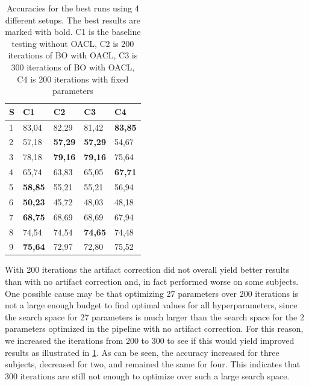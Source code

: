 \begin{table}[H]
	\begin{tabular}{@{}l|llll@{}} \toprule
		S					  & C1             & C2             & C3             & C4             \\ \midrule
		1                     & 83,04          & 82,29          & 81,42          & \textbf{83,85} \\
		2                     & 57,18          & \textbf{57,29} & \textbf{57,29} & 54,67 		  \\
		3                     & 78,18          & \textbf{79,16} & \textbf{79,16} & 75,64          \\
		4                     & 65,74          & 63,83          & 65,05          & \textbf{67,71} \\
		5                     & \textbf{58,85} & 55,21          & 55,21          & 56,94          \\
		6                     & \textbf{50,23} & 45,72          & 48,03          & 48,18          \\
		7                     & \textbf{68,75} & 68,69          & 68,69          & 67,94          \\
		8                     & 74,54          & 74,54          & \textbf{74,65} & 74,48          \\
		9                     & \textbf{75,64} & 72,97          & 72,80          & 75,52 		  \\ \bottomrule
	\end{tabular}
	\centering
	\caption{Accuracies for the best runs using 4 different setups. The best results are marked with bold. C1 is the baseline testing without OACL, C2 is 200 iterations of BO with OACL, C3 is 300 iterations of BO with OACL, C4 is 200 iterations with fixed parameters}
	\label{fig:results}
\end{table}

With 200 iterations the artifact correction did not overall yield better results than with no artifact correction and, in fact performed worse on some subjects. One possible cause may be that optimizing 27 parameters over 200 iterations is not a large enough budget to find optimal values for all hyperparameters, since the search space for 27 parameters is much larger than the search space for the 2 parameters optimized in the pipeline with no artifact correction. For this reason, we increased the iterations from 200 to 300 to see if this would yield improved results as illustrated in \cref{fig:results}. As can be seen, the accuracy increased for three subjects, decreased for two, and remained the same for four. This indicates that 300 iterations are still not enough to optimize over such a large search space.

